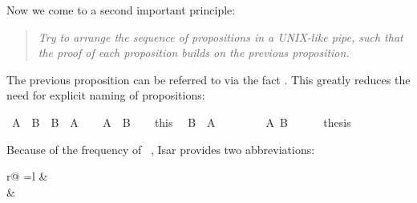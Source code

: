 \begin{isabellebody}
\begin{isamarkuptext}
Now we come to a second important principle:
\begin{quote}\em
Try to arrange the sequence of propositions in a UNIX-like pipe,
such that the proof of each proposition builds on the previous proposition.
\end{quote}
The previous proposition can be referred to via the fact .
This greatly reduces the need for explicit naming of propositions:%
\end{isamarkuptext}%
\isamarkuptrue%
\ {\isachardoublequote}A\ {\isasymand}\ B\ {\isasymlongrightarrow}\ B\ {\isasymand}\ A{\isachardoublequote}\isanewline
\isamarkupfalse%
\isanewline
\ \ \isamarkupfalse%
\ {\isachardoublequote}A\ {\isasymand}\ B{\isachardoublequote}\isanewline
\ \ \isamarkupfalse%
\ this\ \isamarkupfalse%
\ {\isachardoublequote}B\ {\isasymand}\ A{\isachardoublequote}\isanewline
\ \ \isamarkupfalse%
\isanewline
\ \ \ \ \isamarkupfalse%
\ {\isachardoublequote}A{\isachardoublequote}\ {\isachardoublequote}B{\isachardoublequote}\isanewline
\ \ \ \ \isamarkupfalse%
\ {\isacharquery}thesis\ \isamarkupfalse%
\isacommand{{\isachardot}{\isachardot}}\isanewline
\ \ \isamarkupfalse%
\isanewline
\isamarkupfalse%
\isamarkupfalse%
%
\begin{isamarkuptext}%
\noindent Because of the frequency of ~, Isar provides two abbreviations:
\begin{center}
\begin{tabular}{r@ {\quad=\quad}l}
 &   \\
 &  
\end{tabular}
\end{center}


\end{isamarkuptext}
\end{isabellebody}
